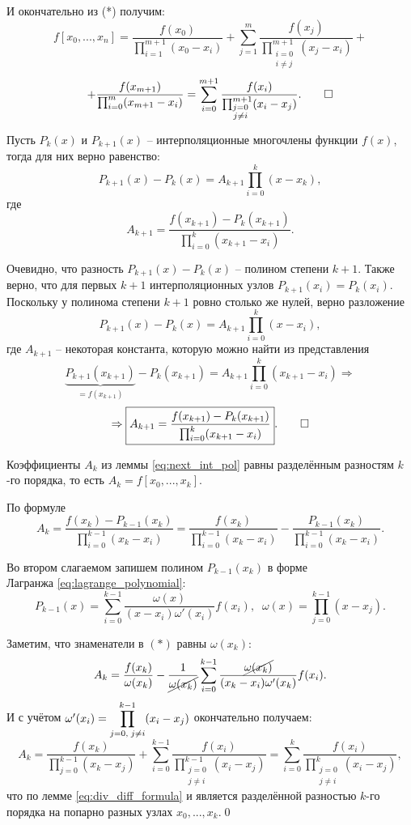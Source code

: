 \documentclass[../main.tex]{subfile}
\begin{document}
	И окончательно из (*) получим:
	\[f[x_0,...,x_n]=\frac{f(x_0)}{\prod_{i=1}^{m+1}(x_0-x_i)}+\sum_{j=1}^
	{m} \frac{f(x_j)}{\prod_{\substack{i=0\\ i\neq j}}^{m+1}(x_j-x_i)}+\]
	\[+\frac{f(x_{m+1})}{\prod_{i=0}^{m}(x_{m+1}-x_i)}=
	\sum_{i=0}^{m+1}\frac{f(x_i)}{\prod_{\substack{j=0\\ j\neq i}}^{m+1}
	(x_i-x_j)}.\qed\]

\begin{lemma}\label{eq:next_int_pol}
	Пусть $P_k(x)$ и $P_{k+1}(x)$ -- интерполяционные многочлены функции
	$f(x)$, тогда для них верно равенство:
	\[P_{k+1}(x)-P_k(x)=A_{k+1}\prod_{i=0}^{k}(x-x_k),\]
	где
	\[A_{k+1}=\frac{f(x_{k+1})-P_k(x_{k+1})}{\prod_{i=0}^{k}(x_{k+1}-x_i)}.\]
\end{lemma}

\beginproof

	Очевидно, что разность $P_{k+1}(x)-P_{k}(x)$ -- полином степени $k+1$.
	Также верно, что для первых $k+1$ интерполяционных узлов $P_{k+1}(x_i)=
	P_{k}(x_i)$. Поскольку у полинома степени $k+1$ ровно столько же нулей,
	верно разложение
	\[P_{k+1}(x)-P_{k}(x)=A_{k+1}\prod_{i=0}^{k}(x-x_i),\]
	где $A_{k+1}$ -- некоторая константа, которую можно найти из представления
	\[\underset{=f(x_{k+1})}{\underbrace{P_{k+1}(x_{k+1})}}-P_{k}(x_{k+1})=
	A_{k+1}\prod_{i=0}^{k}(x_{k+1}-x_i)\Rightarrow\]
	\[\Rightarrow \boxed{A_{k+1}=\frac{f(x_{k+1})-P_k(x_{k+1})}
	{\prod_{i=0}^{k}(x_{k+1}-x_i)}}.\qed\]

\begin{lemma}\label{eq:newton_koef_formula}
	Коэффициенты $A_k$ из леммы \eqref{eq:next_int_pol} равны разделённым
	разностям $k$-го порядка, то есть $A_k=f[x_0,...,x_k].$

\end{lemma}

\beginproof

	По формуле
	\[A_k=\frac{f(x_k)-P_{k-1}(x_k)}{\prod_{i=0}^{k-1}(x_k-x_i)}=
	\frac{f(x_k)}{\prod_{i=0}^{k-1}(x_k-x_i)} - \frac{P_{k-1}(x_k)}
	{\prod_{i=0}^{k-1}(x_k-x_i)}.\tag{*}\]

	Во втором слагаемом запишем полином $P_{k-1}(x_k)$ в форме\\Лагранжа
	\eqref{eq:lagrange_polynomial}:
	\[P_{k-1}(x)=\sum_{i=0}^{k-1}\frac{\omega(x)}{(x-x_i)\omega'(x_i)}
	f(x_i),\;\;
	\omega(x)=\prod_{j=0}^{k-1}(x-x_j).\]

	Заметим, что знаменатели в $(*)$ равны $\omega(x_k)$:
	\[A_k=\frac{f(x_k)}{\omega(x_k)} - \frac{1}{\cancel{\omega(x_k)}}
	\sum_{i=0}^{k-1}\frac{\cancel{\omega(x_k)}}{(x_k-x_i)\omega'(x_k)}
	f(x_i).\]
	И с учётом
	$\omega'(x_i)=\mathlarger\prod_{j=0,\;j\ne i}^{k-1}(x_i-x_j)$
	окончательно получаем:
	\[A_k=\frac{f(x_k)}{\prod_{j=0}^{k-1}(x_k-x_j)} +
	\sum_{i=0}^{k-1}\frac{f(x_i)}{\prod_{\substack{j=0\\j\ne i}}^{k-1}
	(x_i-x_j)}=\sum_{i=0}^{k}\frac{f(x_i)}{\prod_{\substack{j=0\\j\ne i}}^
	{k}(x_i-x_j)},\]
	что по лемме \eqref{eq:div_diff_formula} и является разделённой
	разностью $k$-го порядка на попарно разных узлах $x_0,...,x_k$.\qed
\end{document}
